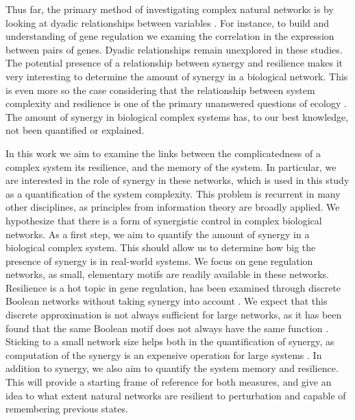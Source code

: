 \documentclass[../main.tex]{subfiles}
\begin{document}
Thus far, the primary method of investigating complex natural networks is by looking at dyadic relationships between variables \cite{}. %
For instance, to build and understanding of gene regulation we examing the correlation in the expression between pairs of genes.
Dyadic relationships remain unexplored in these studies. 
The potential presence of a relationship between synergy and resilience makes it very interesting to determine the amount of synergy in a biological network. 
This is even more so the case considering that the relationship between system complexity and resilience is one of the primary unanswered questions of ecology \cite{}.
The amount of synergy in biological complex systems has, to our best knowledge, not been quantified or explained.

In this work we aim to examine the links between the complicatedness of a complex system its resilience, and the memory of the system.
In particular, we are interested in the role of synergy in these networks, which is used in this study as a quantification of the system complexity.
This problem is recurrent in many other disciplines, as principles from information theory are broadly applied.
We hypothesize that there is a form of synergistic control in complex biological networks.
As a first step, we aim to quantify the amount of synergy in a biological complex system.
This should allow us to determine how big the presence of synergy is in real-world systems.
We focus on gene regulation networks, as small, elementary motifs are readily available in these networks.
Resilience is a hot topic in gene regulation, has been examined through discrete Boolean networks without taking synergy into account \cite{peixoto2012emergence}.
We expect that this discrete approximation is not always sufficient for large networks, as it has been found that the same Boolean motif does not always have the same function \cite{ingram2006network}.
Sticking to a small network size helps both in the quantification of synergy, as computation of the synergy is an expensive operation for large systems \cite{jointpdf}.
In addition to synergy, we also aim to quantify the system memory and resilience.
This will provide a starting frame of reference for both measures, and give an idea to what extent natural networks are resilient to perturbation and capable of remembering previous states.
\end{document}
